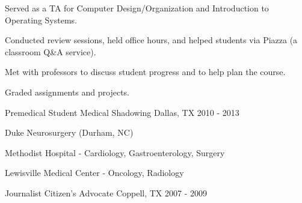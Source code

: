 \begin{cventries}
        {
            \begin{cvitems}
                \item{Served as a TA for Computer Design/Organization and Introduction to Operating Systems.}
                \item{Conducted review sessions, held office hours, and helped students via Piazza (a classroom Q\&A service).}
                \item{Met with professors to discuss student progress and to help plan the course.}
                \item{Graded assignments and projects.}
            \end{cvitems}
        }
    \cventry
        {Premedical Student}
        {Medical Shadowing}
        {Dallas, TX}
        {2010 - 2013}
        {
            \begin{cvitems}
                \item{Duke Neurosurgery (Durham, NC)}
                \item{Methodist Hospital - Cardiology, Gastroenterology, Surgery}
                \item{Lewisville Medical Center - Oncology, Radiology}
            \end{cvitems}
        }
    \cventry
        {Journalist}
        {Citizen's Advocate}
        {Coppell, TX}
        {2007 - 2009}
\end{cventries}
